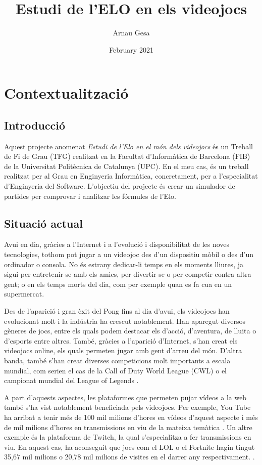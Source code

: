 \documentclass[a4paper]{article}
\title{Estudi de l'ELO en els videojocs}
\author{Arnau Gesa }
\date{February 2021}
\begin{document}
\maketitle
\thispagestyle{empty}

\newpage

\setcounter{page}{1}

\tableofcontents

\newpage
\justify
\section{Contextualització}
\subsection{Introducció}
Aquest projecte anomenat \textit{Estudi de l'Elo en el món dels videojocs} és un Treball de Fi de Grau (TFG) realitzat en la Facultat d'Informàtica de Barcelona (FIB) de la Universitat Politècnica de Catalunya (UPC). En el meu cas, és un treball realitzat per al Grau en Enginyeria Informàtica, concretament, per a l'especialitat d'Enginyeria del Software. L'objectiu del projecte és crear un simulador de partides per comprovar i analitzar les fórmules de l'Elo.

\subsection{Situació actual}
Avui en dia, gràcies a l'Internet i a l'evolució i disponibilitat de les noves tecnologies, tothom pot jugar a un videojoc des d'un dispositiu mòbil o des d'un ordinador o consola. No és estrany dedicar-li temps en els moments lliures, ja sigui per entretenir-se amb els amics, per divertir-se o per competir contra altra gent; o en els temps morts del dia, com per exemple quan es fa cua en un supermercat. 

Des de l'aparició i gran èxit del Pong fins al dia d'avui, els videojocs han evolucionat molt i la indústria ha crescut notablement. Han aparegut diversos gèneres de jocs, entre els quals podem destacar els d'acció, d'aventura, de lluita o d'esports entre altres. També, gràcies a l'aparició d'Internet, s'han creat els videojocs online, els quals permeten jugar amb gent d'arreu del món. D'altra banda, també s'han creat diverses competicions molt importants a escala mundial, com serien el cas de la Call of Duty World League (CWL) o el campionat mundial del League of Legends \cite{importantCompetitions}.

A part d'aquests aspectes, les plataformes que permeten pujar vídeos a la web també s'ha vist notablement beneficiada pels videojocs. Per exemple, You Tube ha arribat a tenir més de 100 mil milions d'hores en vídeos d'aquest aspecte i més de mil milions d'hores en transmissions en viu de la mateixa temàtica \cite{visitesYT}. Un altre exemple és la plataforma de Twitch, la qual s'especialitza a fer transmissions en viu. En aquest cas, ha aconseguit que jocs com el LOL o el Fortnite hagin tingut 35,67 mil milions o 20,78 mil milions de visites en el darrer any respectivament. \cite{visitesTwitch}.
\end{document}
